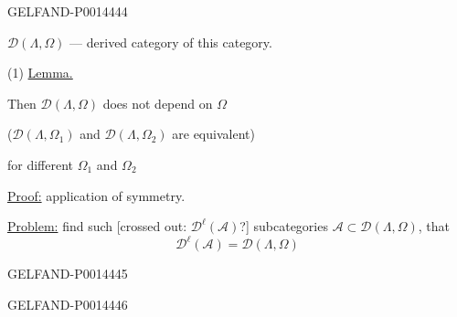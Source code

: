 \begin{GelfandAdjacentEvidence}{GELFAND-P001444}{4}


\(\mathcal D(\Lambda,\Omega)\) — derived category of this category.

(1) \uline{Lemma.}

Then \(\mathcal D(\Lambda,\Omega)\) does not depend on \(\Omega\)

(\(\mathcal D(\Lambda,\Omega_1)\) and \(\mathcal D(\Lambda,\Omega_2)\) are equivalent)

for different \(\Omega_1\) and \(\Omega_2\)

\uline{Proof:} application of symmetry.

\uline{Problem:} find such
[crossed out: \(\mathcal D^{\ell}(\mathcal A)\)?] subcategories \(\mathcal A\subset\mathcal D(\Lambda,\Omega)\), that
\[
\mathcal D^{\ell}(\mathcal A)=\mathcal D(\Lambda,\Omega)
\]
\end{GelfandAdjacentEvidence}
\begin{GelfandAdjacentEvidence}{GELFAND-P001444}{5}

\end{GelfandAdjacentEvidence}
\begin{GelfandAdjacentEvidence}{GELFAND-P001444}{6}

\end{GelfandAdjacentEvidence}
